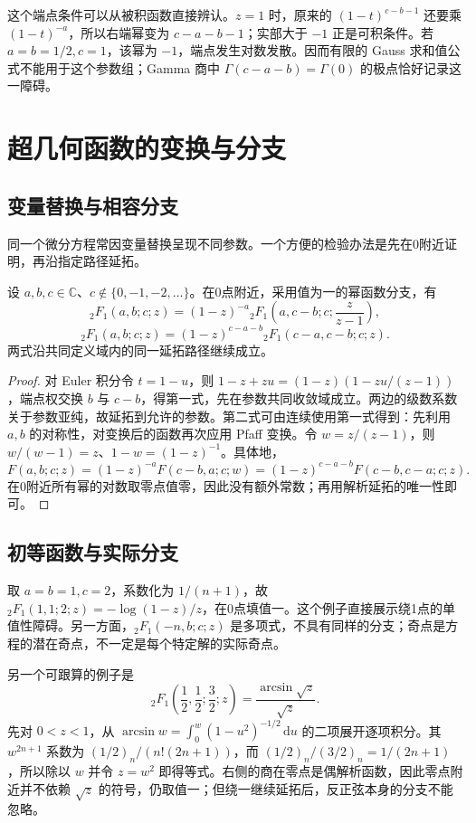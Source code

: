这个端点条件可以从被积函数直接辨认。\(z=1\) 时，原来的 \((1-t)^{c-b-1}\) 还要乘 \((1-t)^{-a}\)，所以右端幂变为 \(c-a-b-1\)；实部大于 \(-1\) 正是可积条件。若 \(a=b=1/2,c=1\)，该幂为 \(-1\)，端点发生对数发散。因而有限的 Gauss 求和值公式不能用于这个参数组；Gamma 商中 \(\Gamma(c-a-b)=\Gamma(0)\) 的极点恰好记录这一障碍。


\section{超几何函数的变换与分支}
\label{b3:sec:F03}

\subsection{变量替换与相容分支}
\label{b3:subsec:F0301}

同一个微分方程常因变量替换呈现不同参数。一个方便的检验办法是先在0附近证明，再沿指定路径延拓。

\begin{proposition}\label{b3:prop:F-transformations}
设 \(a,b,c\in\mathbb C\)、\(c\notin\{0,-1,-2,\ldots\}\)。在0点附近，采用值为一的幂函数分支，有
\[
 {}_2F_1(a,b;c;z)=(1-z)^{-a}
 {}_2F_1\left(a,c-b;c;\frac z{z-1}\right),
\]
\[
 {}_2F_1(a,b;c;z)=(1-z)^{c-a-b}{}_2F_1(c-a,c-b;c;z).
\]
两式沿共同定义域内的同一延拓路径继续成立。
\end{proposition}
\begin{proof}
对 Euler 积分令 \(t=1-u\)，则
\(1-z+zu=(1-z)(1-z u/(z-1))\)，端点权交换 \(b\) 与 \(c-b\)，得第一式，先在参数共同收敛域成立。两边的级数系数关于参数亚纯，故延拓到允许的参数。第二式可由连续使用第一式得到：先利用 \(a,b\) 的对称性，对变换后的函数再次应用 Pfaff 变换。令 \(w=z/(z-1)\)，则 \(w/(w-1)=z\)、\(1-w=(1-z)^{-1}\)。具体地，
\[
 F(a,b;c;z)=(1-z)^{-a}F(c-b,a;c;w)
 =(1-z)^{c-a-b}F(c-b,c-a;c;z).
\]
在0附近所有幂的对数取零点值零，因此没有额外常数；再用解析延拓的唯一性即可。
\end{proof}
\subsection{初等函数与实际分支}
\label{b3:subsec:F0302}

取 \(a=b=1,c=2\)，系数化为 \(1/(n+1)\)，故 \({}_2F_1(1,1;2;z)=-\log(1-z)/z\)，在0点填值一。这个例子直接展示绕1点的单值性障碍。另一方面，\({}_2F_1(-n,b;c;z)\) 是多项式，不具有同样的分支；奇点是方程的潜在奇点，不一定是每个特定解的实际奇点。

另一个可跟算的例子是
\[
 {}_2F_1\left(\frac12,\frac12;\frac32;z\right)
   =\frac{\arcsin\sqrt z}{\sqrt z}.
\]
先对 \(0<z<1\)，从 \(\arcsin w=\int_0^w(1-u^2)^{-1/2}\,\mathrm{d}u\) 的二项展开逐项积分。其 \(w^{2n+1}\) 系数为 \((1/2)_n/(n!(2n+1))\)，而 \((1/2)_n/(3/2)_n=1/(2n+1)\)，所以除以 \(w\) 并令 \(z=w^2\) 即得等式。右侧的商在零点是偶解析函数，因此零点附近并不依赖 \(\sqrt z\) 的符号，仍取值一；但绕一继续延拓后，反正弦本身的分支不能忽略。

